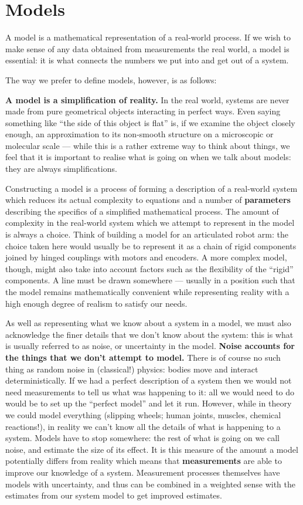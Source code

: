 \documentclass{article}
\begin{document}
\section{Models}

A model is a mathematical representation of a real-world process. If
we wish to make sense of any data obtained from measurements the real
world, a model is essential: it is what connects the numbers we put
into and get out of a system.

The way we prefer to define models, however, is as follows:
\bi
\item {\bf A model is a simplification of reality.} 
\ei
In the real world, systems are never made from pure
geometrical objects interacting in perfect ways.
Even saying something like ``the side of this object is flat'' is, if
we examine the object closely enough, an approximation to its
non-smooth structure on a microscopic or molecular scale --- while
this is a rather extreme way to think about things, we feel that it
is important to realise what is going on when we talk about models:
they are always simplifications.

Constructing a model is a process of forming a description of a
real-world system which reduces its actual complexity to equations and
a number of {\bf parameters} describing the specifics of a simplified
mathematical process. The amount of complexity in the real-world
system which we attempt to represent in the model is always a
choice. Think of building a model for an articulated robot arm: the
choice taken here would usually be to represent it as a chain of rigid
components joined by hinged couplings with motors and encoders. A more
complex model, though, might also take into account factors such as
the flexibility of the ``rigid'' components. A line must be drawn 
somewhere --- usually
in a position such that the model remains mathematically convenient
while representing reality with a high enough degree of realism to
satisfy our needs.

As well as representing what we know about a system in a model, we
must also acknowledge the finer details that we don't know about the
system: this is what is usually referred to as noise, or uncertainty
in the model.  {\bf Noise accounts for the things that we don't
attempt to model.} There is of course no such thing as random noise in
(classical!) physics: bodies move and interact deterministically. If
we had a perfect description of a system then we would not need
measurements to tell us what was happening to it: all we would need to
do would be to set up the ``perfect model'' and let it run.  However,
while in theory we could model everything (slipping wheels; human
joints, muscles, chemical reactions!), in reality we can't know all
the details of what is happening to a system. Models have to stop
somewhere: the rest of what is going on we call noise, and estimate
the size of its effect. It is this measure of the amount a model
potentially differs from reality which means that {\bf measurements}
are able to improve our knowledge of a system. Measurement processes
themselves have models with uncertainty, and thus can be combined in a
weighted sense with the estimates from our system model to get
improved estimates.
\end{document}
